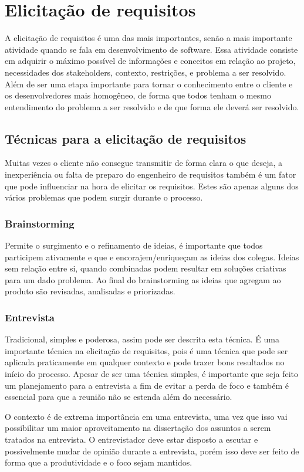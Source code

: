 \chapter[Elicitação de requisitos]{Elicitação de requisitos}
A elicitação de requisitos é uma das mais importantes, senão a mais importante atividade quando se fala em desenvolvimento de software. Essa atividade consiste em adquirir o máximo possível de informações e conceitos em relação ao projeto, necessidades dos stakeholders, contexto, restrições, e problema a ser resolvido. Além de ser uma etapa importante para tornar o conhecimento entre o cliente e os desenvolvedores mais homogêneo, de forma que todos tenham o mesmo entendimento do problema a ser resolvido e de que forma ele deverá ser resolvido.
\section{Técnicas para a elicitação de requisitos}
Muitas vezes o cliente não consegue transmitir de forma clara o que deseja, a inexperiência ou falta de preparo do engenheiro de requisitos também é um fator que pode influenciar na hora de elicitar os requisitos. Estes são apenas alguns dos vários problemas que podem surgir durante o processo.
\subsection{Brainstorming}
Permite o surgimento e o refinamento de ideias, é importante que todos participem ativamente e que e encorajem/enriqueçam as ideias dos colegas. Ideias sem relação entre si, quando combinadas podem resultar em soluções criativas para um dado problema. Ao final do brainstorming as ideias que agregam ao produto são revisadas, analisadas e priorizadas.
\subsection{Entrevista}
Tradicional, simples e poderosa, assim pode ser descrita esta técnica. É uma importante técnica na elicitação de requisitos, pois é uma técnica que pode ser aplicada praticamente em qualquer contexto e pode trazer bons resultados no início do processo. Apesar de ser uma técnica simples, é importante que seja feito um planejamento para a entrevista a fim de evitar a perda de foco e também é essencial para que a reunião não se estenda além do necessário.

O contexto é de extrema importância em uma entrevista, uma vez que isso vai possibilitar um maior aproveitamento na dissertação dos assuntos a serem tratados na entrevista. O entrevistador deve estar disposto a escutar e possivelmente mudar de opinião durante a entrevista, porém isso deve ser feito de forma que a produtividade e o foco sejam mantidos.


